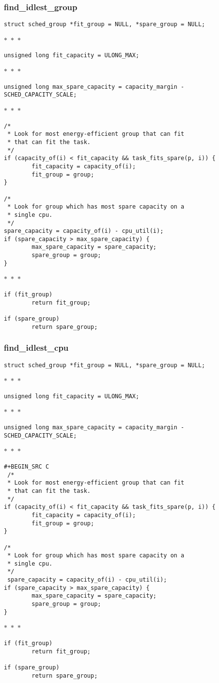 \documentclass{article}
\newcommand{\divider}{{\begin{center}
  $\ast$~$\ast$~$\ast$
\end{center}}}
\begin{document}
\subsubsection{find\_idlest\_group}

\begin{verbatim}
struct sched_group *fit_group = NULL, *spare_group = NULL;
\end{verbatim}
\divider
\begin{verbatim}
unsigned long fit_capacity = ULONG_MAX;
\end{verbatim}
\divider
\begin{verbatim}
unsigned long max_spare_capacity = capacity_margin - SCHED_CAPACITY_SCALE;
\end{verbatim}
\divider
\begin{verbatim}
/*
 * Look for most energy-efficient group that can fit
 * that can fit the task.
 */
if (capacity_of(i) < fit_capacity && task_fits_spare(p, i)) {
        fit_capacity = capacity_of(i);
        fit_group = group;
}

/*
 * Look for group which has most spare capacity on a
 * single cpu.
 */
spare_capacity = capacity_of(i) - cpu_util(i);
if (spare_capacity > max_spare_capacity) {
        max_spare_capacity = spare_capacity;
        spare_group = group;
}
\end{verbatim}
\divider
\begin{verbatim}
if (fit_group)
        return fit_group;

if (spare_group)
        return spare_group;
\end{verbatim}

\subsubsection{find\_idlest\_cpu}

\begin{verbatim}
struct sched_group *fit_group = NULL, *spare_group = NULL;
\end{verbatim}
\divider
\begin{verbatim}
unsigned long fit_capacity = ULONG_MAX;
\end{verbatim}
\divider
\begin{verbatim}
unsigned long max_spare_capacity = capacity_margin - SCHED_CAPACITY_SCALE;
\end{verbatim}
\divider
\begin{verbatim}
#+BEGIN_SRC C
 /*
 * Look for most energy-efficient group that can fit
 * that can fit the task.
 */
if (capacity_of(i) < fit_capacity && task_fits_spare(p, i)) {
        fit_capacity = capacity_of(i);
        fit_group = group;
}

/*
 * Look for group which has most spare capacity on a
 * single cpu.
 */
 spare_capacity = capacity_of(i) - cpu_util(i);
if (spare_capacity > max_spare_capacity) {
        max_spare_capacity = spare_capacity;
        spare_group = group;
}
\end{verbatim}
\divider
\begin{verbatim}
if (fit_group)
        return fit_group;

if (spare_group)
        return spare_group;
\end{verbatim}
\end{document}
